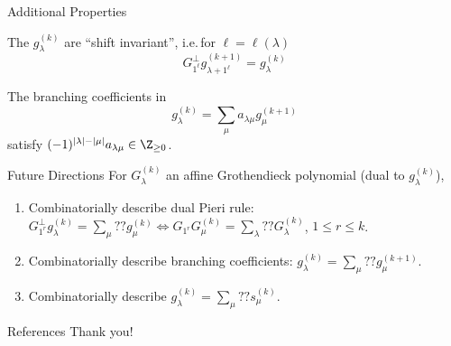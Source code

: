 \documentclass{beamer}
\begin{document}
\begin{frame}{Additional Properties}
  \begin{theorem}
    The \(g_\lambda^{(k)}\) are ``shift
        invariant'', i.e.\,for \(\ell = \ell(\lambda)\)
      \[
        G_{1^\ell}^\perp g_{\lambda+1^\ell}^{(k+1)} = g_\lambda^{(k)}
      \]
  \end{theorem}%
  \begin{theorem}
    The branching coefficients in 
    \[
      g_\lambda^{(k)} = \sum_\mu a_{\lambda \mu} g_\mu^{(k+1)}
    \]
    satisfy \((-1)^{|\lambda|-|\mu|}a_{\lambda \mu} \in \Z_{\geq 0}\).
  \end{theorem}
\end{frame}
\begin{frame}{Future Directions}
    For \(G_\lambda^{(k)}\) an affine Grothendieck polynomial (dual to \(g_\lambda^{(k)}\)),
    \begin{enumerate}
    \item Combinatorially describe dual Pieri rule: \(G_{1^r}^\perp g_\lambda^{(k)} = \sum_\mu
      ?? g_\mu^{(k)} \iff G_{1^r} G_\mu^{(k)} = \sum_\lambda ?? G_\lambda^{(k)}\),  \(1 \leq r \leq k\).
    \item Combinatorially describe branching coefficients: \(g_\lambda^{(k)} =
      \sum_\mu ?? g_\mu^{(k+1)}\).
    \item Combinatorially describe \(g_\lambda^{(k)} = \sum_\mu ?? s_\mu^{(k)}\).
    \end{enumerate}
\end{frame}
\begin{frame}{References}
  Thank you!
  \begin{bibdiv}
  \begin{biblist}
  \end{biblist}
  \end{bibdiv}
\end{frame}
\end{document}
